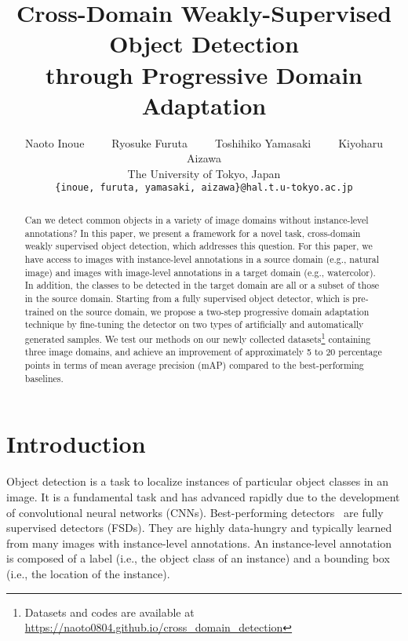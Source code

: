 \documentclass[10pt,twocolumn,letterpaper]{article}
\begin{document}
\title{Cross-Domain Weakly-Supervised Object Detection \\ through Progressive Domain Adaptation}

\author{
	Naoto Inoue~~~~~Ryosuke Furuta~~~~~Toshihiko Yamasaki~~~~~Kiyoharu Aizawa\\
	The University of Tokyo, Japan\\
	{\tt\small \{inoue, furuta, yamasaki, aizawa\}@hal.t.u-tokyo.ac.jp}
}

\maketitle


\begin{abstract}
Can we detect common objects in a variety of image domains without instance-level annotations?
In this paper, we present a framework for a novel task, cross-domain weakly supervised object detection, which addresses this question.
For this paper, we have access to images with instance-level annotations in a source domain (e.g., natural image) and images with image-level annotations in a target domain (e.g., watercolor).
In addition, the classes to be detected in the target domain are all or a subset of those in the source domain.
Starting from a fully supervised object detector, which is pre-trained on the source domain, we propose a two-step progressive domain adaptation technique by fine-tuning the detector on two types of artificially and automatically generated samples.
We test our methods on our newly collected datasets\footnote{Datasets and codes are available at \url{https://naoto0804.github.io/cross_domain_detection}} containing three image domains, and achieve an improvement of approximately 5 to 20 percentage points in terms of mean average precision (mAP) compared to the best-performing baselines.
\end{abstract}

\section{Introduction}
Object detection is a task to localize instances of particular object classes in an image.
It is a fundamental task and has advanced rapidly due to the development of convolutional neural networks (CNNs).
Best-performing detectors~\cite{girshick2015fast,ren2015faster,liu2016ssd,redmon2016yolo9000,li2016r,lin2017focal} are fully supervised detectors (FSDs).
They are highly data-hungry and typically learned from many images with instance-level annotations.
An instance-level annotation is composed of a label (i.e., the object class of an instance) and a bounding box (i.e., the location of the instance).
\end{document}
